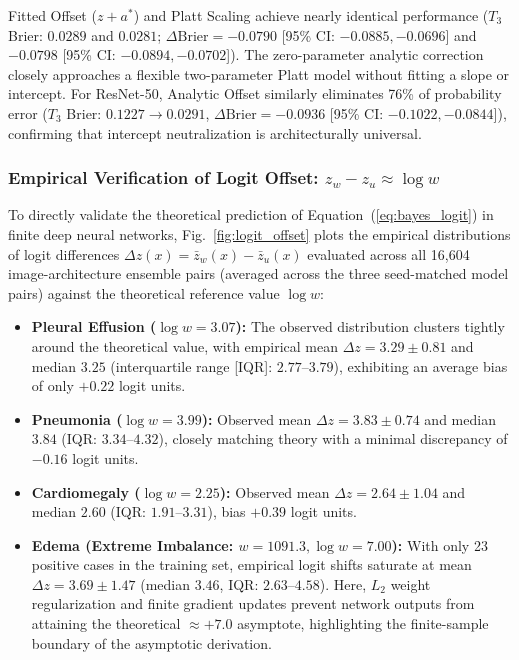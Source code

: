 \documentclass[preprint,12pt]{elsarticle}
\begin{document}
Fitted Offset ($z + a^*$) and Platt Scaling achieve nearly identical performance ($T_3$ Brier: $0.0289$ and $0.0281$; $\Delta\text{Brier} = -0.0790$ [95\% CI: $-0.0885, -0.0696$] and $-0.0798$ [95\% CI: $-0.0894, -0.0702$]). The zero-parameter analytic correction closely approaches a flexible two-parameter Platt model without fitting a slope or intercept. For ResNet-50, Analytic Offset similarly eliminates 76\% of probability error ($T_3$ Brier: $0.1227 \to 0.0291$, $\Delta\text{Brier} = -0.0936$ [95\% CI: $-0.1022, -0.0844$]), confirming that intercept neutralization is architecturally universal.

\subsubsection{\texorpdfstring{Empirical Verification of Logit Offset: $z_w - z_u \approx \log w$}{Empirical Verification of Logit Offset: z_w - z_u approx log w}}
\label{sec:logit_offset}
To directly validate the theoretical prediction of Equation~(\ref{eq:bayes_logit}) in finite deep neural networks, Fig.~\ref{fig:logit_offset} plots the empirical distributions of logit differences $\Delta z(x) = \bar{z}_w(x) - \bar{z}_u(x)$ evaluated across all 16,604 image-architecture ensemble pairs (averaged across the three seed-matched model pairs) against the theoretical reference value $\log w$:
\begin{itemize}
    \item \textbf{Pleural Effusion ($\log w = 3.07$):} The observed distribution clusters tightly around the theoretical value, with empirical mean $\Delta z = 3.29 \pm 0.81$ and median $3.25$ (interquartile range [IQR]: $2.77$--$3.79$), exhibiting an average bias of only $+0.22$ logit units.
    \item \textbf{Pneumonia ($\log w = 3.99$):} Observed mean $\Delta z = 3.83 \pm 0.74$ and median $3.84$ (IQR: $3.34$--$4.32$), closely matching theory with a minimal discrepancy of $-0.16$ logit units.
    \item \textbf{Cardiomegaly ($\log w = 2.25$):} Observed mean $\Delta z = 2.64 \pm 1.04$ and median $2.60$ (IQR: $1.91$--$3.31$), bias $+0.39$ logit units.
    \item \textbf{Edema (Extreme Imbalance: $w = 1091.3, \log w = 7.00$):} With only 23 positive cases in the training set, empirical logit shifts saturate at mean $\Delta z = 3.69 \pm 1.47$ (median $3.46$, IQR: $2.63$--$4.58$). Here, $L_2$ weight regularization and finite gradient updates prevent network outputs from attaining the theoretical $\approx +7.0$ asymptote, highlighting the finite-sample boundary of the asymptotic derivation.
\end{itemize}
\end{document}
